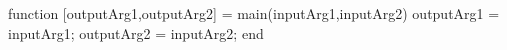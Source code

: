 function [outputArg1,outputArg2] = main(inputArg1,inputArg2)
outputArg1 = inputArg1;
outputArg2 = inputArg2;
end

